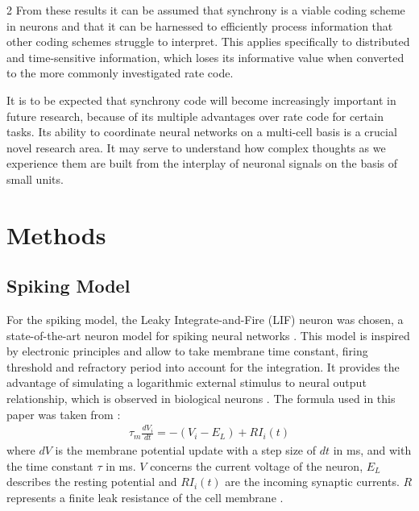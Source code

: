 \documentclass[12pt,a4paper]{article}
\begin{document}
\begin{multicols}{2}
            From these results it can be assumed that synchrony is a viable coding scheme in neurons and that it can be harnessed to efficiently process information that other coding schemes struggle to interpret. This applies specifically to distributed and time-sensitive information, which loses its informative value when converted to the more commonly investigated rate code.
            
            It is to be expected that synchrony code will become increasingly important in future research, because of its multiple advantages over rate code for certain tasks. Its ability to coordinate neural networks on a multi-cell basis is a crucial novel research area. It may serve to understand how complex thoughts as we experience them are built from the interplay of neuronal signals on the basis of small units.
            
        \section{Methods}
		\subsection{Spiking Model}\label{sec:LIF}
            For the spiking model, the Leaky Integrate-and-Fire (LIF) neuron was chosen, a state-of-the-art neuron model for spiking neural networks \cite{A}. This model is inspired by electronic principles and allow to take membrane time constant, firing threshold and refractory period into account for the integration. It provides the advantage of simulating a logarithmic external stimulus to neural output relationship, which is observed in biological neurons \cite{E}. The formula used in this paper was taken from \textcite{L}:
            \begin{gather}\tau_{m}\frac{dV_{i}}{dt}=-(V_{i}-E_{L})+RI_{i}(t)\end{gather} where $dV$ is the membrane potential update with a step size of $dt$ in ms, and with the time constant $\tau$ in ms. $V$ concerns the current voltage of the neuron, $E_{L}$ describes the resting potential and $RI_{i}(t)$ are the incoming synaptic currents. $R$ represents a finite leak resistance of the cell membrane \cite{L, ZN}.
            

\end{multicols}
\end{document}
